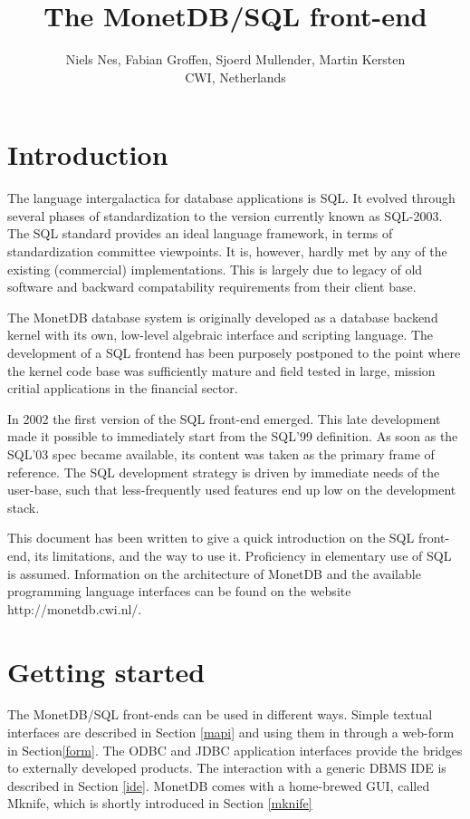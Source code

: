 \documentclass[10pt,twocolumn,fleqn]{article}
\begin{document}
\title{The MonetDB/SQL front-end}
\author{ Niels Nes, Fabian Groffen, Sjoerd Mullender, Martin Kersten \\{\small \textsc{CWI}, Netherlands}}
\date{}
\maketitle

\section{Introduction}
The language intergalactica for database applications is SQL. It evolved
through several phases of standardization to the version currently
known as SQL-2003.
The SQL standard provides an ideal language framework, 
in terms of standardization committee viewpoints.
It is, however,
hardly met by any of the existing (commercial) implementations.
This is largely due to legacy of old software and backward compatability
requirements from their client base.
 
The MonetDB database system is originally developed as a database backend
kernel with its own, low-level algebraic interface and scripting language.
The development of a SQL frontend has been purposely postponed to the point
where the kernel code base was sufficiently mature and field tested in
large, mission critial applications in the financial sector.

In 2002 the first version of the SQL front-end emerged. 
This late development made it possible to immediately start from the SQL'99
definition. As soon as the SQL'03 spec became available, its content
was taken as the primary frame of reference.
The SQL development strategy is driven by immediate needs of the
user-base, such that less-frequently used features end up low on
the development stack.

This document has been written to give a quick introduction on the SQL
front-end, its limitations, and the way to use it. 
Proficiency in elementary use of SQL is assumed.
Information on the architecture of MonetDB and the available programming
language interfaces can be found on the website http://monetdb.cwi.nl/.

\section{Getting started}
The MonetDB/SQL front-ends can be used in different ways. 
Simple textual interfaces are described in Section \ref{mapi} and
using them in through a web-form in Section\ref{form}.
The ODBC and JDBC application interfaces provide the bridges
to externally developed products. The interaction with
a generic DBMS IDE is described in Section \ref{ide}.
MonetDB comes with a home-brewed GUI, called Mknife, which
is shortly introduced in Section \ref{mknife}
\end{document}
